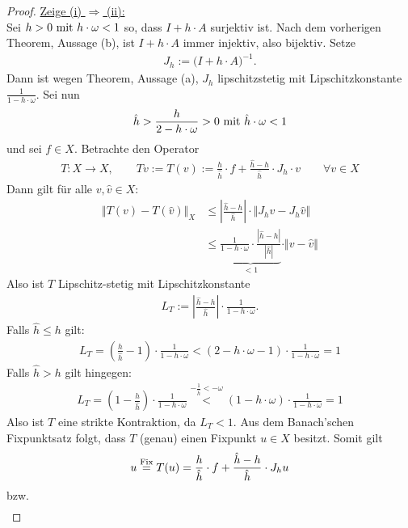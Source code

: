 \begin{proof}
\underline{Zeige (i) $\Rightarrow$ (ii):}\\
Sei $h>0\mit h\cdot\omega<1$ so, dass $I+h\cdot A$ surjektiv ist. Nach dem vorherigen Theorem, Aussage (b), ist $I+h\cdot A$ immer injektiv, also bijektiv. Setze
\begin{align*}
J_h:=\big(I+h\cdot A\big)^{-1}.
\end{align*}
Dann ist wegen Theorem, Aussage (a), $J_h$ lipschitzstetig mit Lipschitzkonstante $\frac{1}{1-h\cdot\omega}$. Sei nun 
\begin{align*}
\hat{h}>\frac{h}{2-h\cdot\omega}>0\mit\hat{h}\cdot\omega<1
\end{align*}
und sei $f\in X$. Betrachte den Operator
\begin{align*}
T:X\to X,\qquad Tv:=T(v)
:=\frac{h}{\hat{h}}\cdot f+\frac{\hat{h}-h}{\hat{h}}\cdot J_h\cdot v\qquad\forall v\in X
\end{align*}
Dann gilt für alle $v,\hat{v}\in X$:
\begin{align*}
\big\Vert T(v)-T(\hat{v})\big\Vert_X
&\leq
\left|\frac{\hat{h}-h}{\hat{h}}\right|\cdot\big\Vert J_h v-J_h \hat{v}\big\Vert\\
&\leq
\underbrace{\frac{1}{1-h\cdot\omega}\cdot\frac{|\hat{h}-h|}{|\hat{h}|}}_{<1}\cdot\Vert v-\hat{v}\Vert
\end{align*}
Also ist $T$ Lipschitz-stetig mit Lipschitzkonstante 
\begin{align*}
L_T:=\left|\frac{\hat{h}-h}{\hat{h}}\right|
\cdot\frac{1}{1-h\cdot\omega}.
\end{align*}
Falls $\hat{h}\leq h$ gilt:
\begin{align*}
L_T=\left(\frac{h}{\hat{h}}-1\right)\cdot\frac{1}{1-h\cdot\omega}
<
(2-h\cdot\omega-1)\cdot\frac{1}{1-h\cdot\omega}
=1
\end{align*}
Falls $\hat{h}>h$ gilt hingegen:
\begin{align*}
L_T=\left(1-\frac{h}{\hat{h}}\right)\cdot\frac{1}{1-h\cdot\omega}
\stackrel{-\frac{1}{\hat{h}}<-\omega}{<}
(1-h\cdot\omega)\cdot\frac{1}{1-h\cdot\omega}
=1
\end{align*}
Also ist $T$ eine strikte Kontraktion, da $L_T<1$. Aus dem Banach'schen Fixpunktsatz folgt, dass $T$ (genau) einen Fixpunkt $u\in X$ besitzt. Somit gilt
\begin{align*}
u\stackeq{\text{Fix}}T(u)
=\frac{h}{\hat{h}}\cdot f+\frac{\hat{h}-h}{\hat{h}}\cdot J_h u
\end{align*}
bzw. 
\begin{align*}

\end{align*}
\end{proof}
